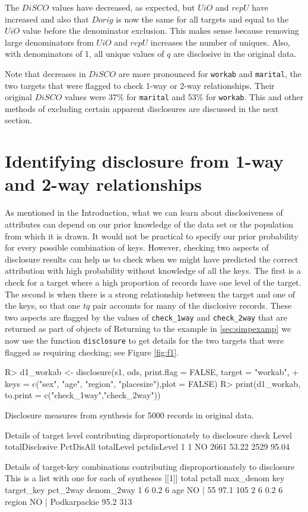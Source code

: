 \documentclass[12pt]{article}
\renewcommand{\baselinestretch}{1.5} %
\begin{document}
The $DiSCO$ values have decreased, as expected, but $UiO$ and $repU$
have increased and also that $Dorig$ is now the same for all targets and equal to the $UiO$ value before the denominator exclusion. This makes sense because 
removing large denominators from $UiO$ and $repU$ increases the number of uniques. Also, with denominators of 1, all unique values of $q$ are disclosive in the original data.

Note that decreases in $DiSCO$ are more pronounced
for \texttt{workab} and \texttt{marital}, the two targets that were flagged to check 1-way or 
2-way relationships. Their original $DiSCO$ values were 37\% for \texttt{marital} and 53\%
for \texttt{workab}. This and other methods of excluding certain apparent disclosures 
are discussed in the next section.

 
 \section{Identifying disclosure from 1-way and 2-way relationships}\label{sec:onetwoway}
As mentioned in the Introduction, what we can learn about disclosiveness of attributes can depend on our prior knowledge of the data set or the population from which it is drawn. It would not be practical to specify our prior probability for every possible combination of keys. However, checking two aspects
of disclosure results can help us to check when we might have predicted the correct attribution with high probability without knowledge of all the keys.
The first is a check for a target where a high proportion of records have one level of the target. The second is when there is a strong relationship
between the target and one of the keys, so that one $tq$ pair accounts for many of the disclosive records. These two aspects are flagged by the
values of \texttt{check\_1way} and \texttt{check\_2way} that are returned as part of objects of 
Returning to the example in \ref{sec:simpexamp} we now use the function \texttt{disclosure} 
to get details for the two targets that were flagged as requiring checking; see Figure \ref{fig:f1}. 
\renewcommand{\baselinestretch}{1.0}
\begin{Schunk}
\begin{Sinput}
R> d1_workab <- disclosure(s1, ods, print.flag = FALSE, target = "workab",
+     keys = c("sex", "age", "region", "placesize"),plot = FALSE)
R> print(d1_workab, to.print = c("check_1way","check_2way"))
\end{Sinput}
\begin{Soutput}
Disclosure measures from synthesis for 5000 records in original data.

Details of target level contributing disproportionately to disclosure
  check Level totalDisclosive PctDisAll totalLevel pctdisLevel
1     1    NO            2661     53.22       2529       95.04

Details of target-key combinations contributing disproportionately to disclosure
This is a list with one for each of syntheses
[[1]]
  total pctall max_denom    key        target_key pct_2way denom_2way
1     6    0.2         6    age           NO | 55     97.1        105
2     6    0.2         6 region NO | Podkarpackie     95.2        313
\end{Soutput}
\end{Schunk}
\end{document}
